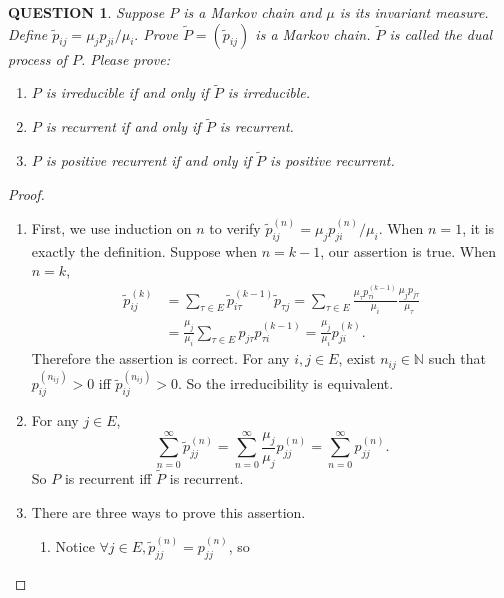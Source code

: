 \documentclass[12pt]{article}
\renewcommand{\(}{\left(}%
\renewcommand{\)}{\right)}%
\renewcommand{\[}{\left[}%
\renewcommand{\]}{\right]}%
\newcommand{\n}{\mathbb{N}}
\newtheorem{question}{QUESTION}[section]}
\newtheorem{proof}{Proof.}}
\begin{document}
  \begin{question}
  Suppose $P$ is a Markov chain and $\mu$ is its invariant measure. Define $\widetilde{p}_{ij}=\mu_jp_{ji}/\mu_i.$ Prove $\widetilde{P}=(\widetilde{p}_{ij} )$ is a Markov chain. $\widetilde{P}$ is called the dual process of $P$. Please prove:
  \begin{enumerate}
   \item $P$ is irreducible if and only if $\widetilde{P}$ is irreducible.
   \item $P$ is recurrent if and only if $\widetilde{P}$ is recurrent.
   \item $P$ is positive recurrent if and only if $\widetilde{P}$ is positive recurrent.
  \end{enumerate}
 \end{question}
 \begin{proof}
  \begin{enumerate}
   \item 
   First, we use induction on $n$ to verify $\widetilde{p}_{ij}^{(n)}=\mu_jp_{ji}^{(n)}/\mu_i$. When $n=1$, it is exactly the definition.
   Suppose when $n=k-1$, our assertion is true. When $n=k$,
   \begin{equation*}
    \begin{split}
    	\widetilde{p}_{ij}^{(k)}&=\sum_{\tau\in E}\widetilde{p}_{i\tau}^{(k-1)}\widetilde{p}_{\tau j}= \sum_{\tau\in E}\frac{\mu_\tau p_{\tau i}^{(k-1)}}{\mu_i} \frac{\mu_j p_{j\tau}}{\mu_\tau}\\
    	&=\frac{\mu_j}{\mu_i}\sum_{\tau\in E}p_{j\tau}p_{\tau i}^{(k-1)}=\frac{\mu_j}{\mu_i}p_{ji}^{(k)}.
    \end{split}
   \end{equation*} 
   Therefore the assertion is correct. For any $i,j\in E$, exist $n_{ij}\in\n$ such that $p_{ij}^{(n_{ij})}>0$ iff $\widetilde{ p}_{ij}^{(n_{ij})}>0$. So the irreducibility is equivalent.
   \item 
   For any $j\in E$,
   \begin{equation*}
    \sum_{n=0}^\infty \widetilde{p}_{jj}^{(n)}=\sum_{n=0}^\infty\frac{\mu_j}{\mu_j}p_{jj}^{(n)}=\sum_{n=0}^\infty p_{jj}^{(n)}.
   \end{equation*}
   So $P$ is recurrent iff $\widetilde{P}$ is recurrent.
   \item There are three ways to prove this assertion.
   \begin{enumerate}
   \item Notice $\forall j\in E,\widetilde{p}_{jj}^{(n)}=p_{jj}^{(n)}$, so

\end{enumerate}
\end{enumerate}
\end{proof}
\end{document}
